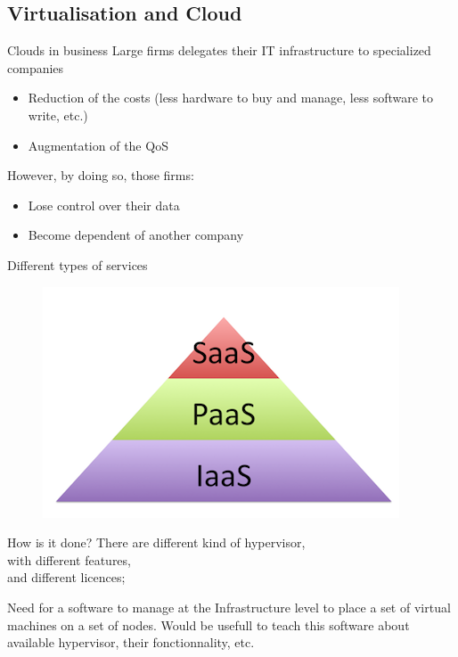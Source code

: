\documentclass{beamer}
\begin{document}
\subsection{Virtualisation and Cloud}
\begin{frame}{Clouds in business}
Large firms delegates their IT infrastructure to specialized companies
\begin{itemize}
	\item Reduction of the costs (less hardware to buy and manage,
		less software to write, etc.)
	\item Augmentation of the QoS
\end{itemize}
However, by doing so, those firms:
\begin{itemize}
	\item Lose control over their data
	\item Become dependent of another company
\end{itemize}
\end{frame}

\begin{frame}{Different types of services}
\begin{figure}[!ht]
	\centering
	\includegraphics[scale=.45]{imgs/cloud-pyramid.png}
\end{figure}
\end{frame}

\begin{frame}{How is it done?}
There are different kind  of hypervisor,\\
\pause with different features,\\ %
\pause and different licences; %

Need for a software to manage at the Infrastructure level to place
a set of virtual machines on a set of nodes. %
\pause Would be usefull to teach this software about available hypervisor,
their fonctionnality, etc.
\end{frame}
\end{document}
